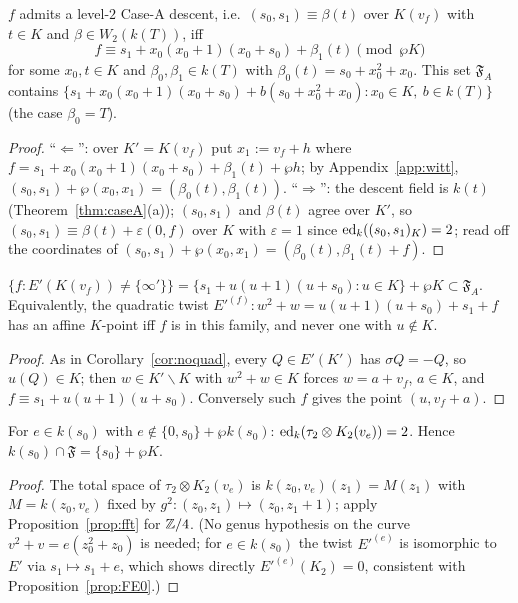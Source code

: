 \begin{proposition}\label{prop:FA}
$f$ admits a level-$2$ Case-A descent, i.e.\ $(s_0,s_1)\equiv\beta(t)$ over $K(v_f)$
with $t\in K$ and $\beta\in W_2(k(T))$, iff
\[
f\equiv s_1+x_0(x_0+1)(x_0+s_0)+\beta_1(t)\pmod{\wp K}
\]
for some $x_0,t\in K$ and $\beta_0,\beta_1\in k(T)$ with $\beta_0(t)=s_0+x_0^2+x_0$.
This set $\mathfrak F_A$ contains $\{s_1+x_0(x_0+1)(x_0+s_0)+b(s_0+x_0^2+x_0):x_0\in K,\
b\in k(T)\}$ (the case $\beta_0=T$). 
\end{proposition}

\begin{proof}
``$\Leftarrow$'': over $K'=K(v_f)$ put $x_1:=v_f+h$ where $f=s_1+x_0(x_0+1)(x_0+s_0)+
\beta_1(t)+\wp h$; by Appendix~\ref{app:witt},
$(s_0,s_1)+\wp(x_0,x_1)=(\beta_0(t),\beta_1(t))$. ``$\Rightarrow$'': the descent field is
$k(t)$ (Theorem~\ref{thm:caseA}(a)); $(s_0,s_1)$ and $\beta(t)$ agree over $K'$, so
$(s_0,s_1)\equiv\beta(t)+\varepsilon(0,f)$ over $K$ with $\varepsilon=1$ since
$\operatorname{ed}_k((s_0,s_1)_K)=2$; read off the coordinates of $(s_0,s_1)+\wp(x_0,x_1)=
(\beta_0(t),\beta_1(t)+f)$.
\end{proof}

\begin{proposition}[the $E_0$-part of $\mathfrak F$]\label{prop:FE0}
$\{f:E'(K(v_f))\ne\{\infty'\}\}=\{s_1+u(u+1)(u+s_0):u\in K\}+\wp K\subset\mathfrak F_A$.
Equivalently, the quadratic twist $E'^{(f)}\colon w^2+w=u(u+1)(u+s_0)+s_1+f$ has an
affine $K$-point iff $f$ is in this family, and never one with $u\notin K$. 
\end{proposition}

\begin{proof}
As in Corollary~\ref{cor:noquad}, every $Q\in E'(K')$ has $\sigma Q=-Q$, so $u(Q)\in K$;
then $w\in K'\smallsetminus K$ with $w^2+w\in K$ forces $w=a+v_f$, $a\in K$, and
$f\equiv s_1+u(u+1)(u+s_0)$. Conversely such $f$ gives the point $(u,v_f+a)$.
\end{proof}

\begin{proposition}[$f\in k(s_0)$]\label{prop:ks0}
For $e\in k(s_0)$ with $e\notin\{0,s_0\}+\wp k(s_0)$: $\operatorname{ed}_k(\tau_2\otimes K_2(v_e))=2$.
Hence $k(s_0)\cap\mathfrak F=\{s_0\}+\wp K$. \stag{proved}
\end{proposition}

\begin{proof}
The total space of $\tau_2\otimes K_2(v_e)$ is $k(z_0,v_e)(z_1)=M(z_1)$ with
$M=k(z_0,v_e)$ fixed by $g^2\colon(z_0,z_1)\mapsto(z_0,z_1+1)$; apply
Proposition~\ref{prop:fft} for $\mathbb Z/4$. (No genus hypothesis on the curve
$v^2+v=e(z_0^2+z_0)$ is needed; for $e\in k(s_0)$ the twist $E'^{(e)}$ is isomorphic to
$E'$ via $s_1\mapsto s_1+e$, which shows directly $E'^{(e)}(K_2)=0$, consistent with
Proposition~\ref{prop:FE0}.)
\end{proof}

